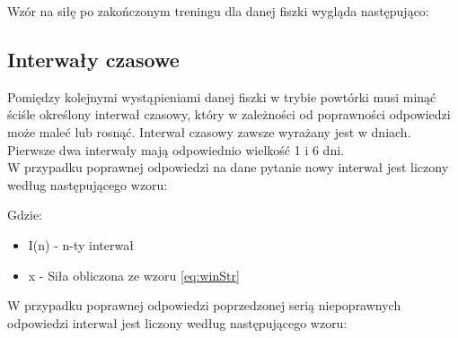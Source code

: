 Wzór na siłę po zakończonym treningu dla danej fiszki wygląda następująco:\\


\subsection{Interwały czasowe}

Pomiędzy kolejnymi wystąpieniami danej fiszki w trybie powtórki musi minąć ściśle określony interwał czasowy, który w zależności od poprawności odpowiedzi może maleć lub rosnąć. 
Interwał czasowy zawsze wyrażany jest w dniach. Pierwsze dwa interwały mają odpowiednio wielkość 1 i 6 dni.
\\
W przypadku poprawnej odpowiedzi na dane pytanie nowy interwał jest liczony według następującego wzoru:



Gdzie:
\begin{itemize}
	\item I(n) - n-ty interwał
	\item x - Siła obliczona ze wzoru \ref{eq:winStr}
\end{itemize}

W przypadku poprawnej odpowiedzi poprzedzonej serią niepoprawnych odpowiedzi interwał jest liczony według następującego wzoru:


